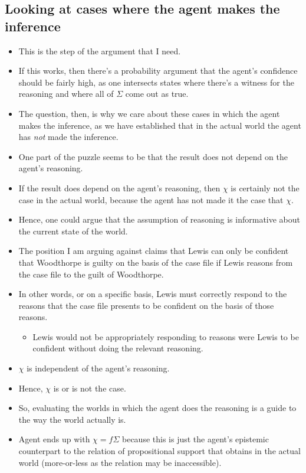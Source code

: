 \documentclass[10pt]{article}
\begin{document}
\subsection{Looking at cases where the agent makes the inference}
\label{sec:looking-at-cases}

\begin{itemize}
\item This is the step of the argument that I need.
\item If this works, then there's a probability argument that the agent's confidence should be fairly high, as one intersects states where there's a witness for the reasoning and where all of \(\Sigma\) come out as true.
\item The question, then, is why we care about these cases in which the agent makes the inference, as we have established that in the actual world the agent has \emph{not} made the inference.
\item One part of the puzzle seems to be that the result does not depend on the agent's reasoning.
\item If the result does depend on the agent's reasoning, then \(\chi\) is certainly not the case in the actual world, because the agent has not made it the case that \(\chi\).
\item Hence, one could argue that the assumption of reasoning is informative about the current state of the world.
\end{itemize}

\begin{itemize}
\item The position I am arguing against claims that Lewis can only be confident that Woodthorpe is guilty on the basis of the case file if Lewis reasons from the case file to the guilt of Woodthorpe.
\item In other words, or on a specific basis, Lewis must correctly respond to the reasons that the case file presents to be confident on the basis of those reasons.
  \begin{itemize}
  \item Lewis would not be appropriately responding to reasons were Lewis to be confident without doing the relevant reasoning.
  \end{itemize}
\end{itemize}

\begin{itemize}
\item \(\chi\) is independent of the agent's reasoning.
\item Hence, \(\chi\) is or is not the case.
\item So, evaluating the worlds in which the agent does the reasoning is a guide to the way the world actually is.
\item Agent ends up with \(\chi = f\Sigma\) because this is just the agent's epistemic counterpart to the relation of propositional support that obtains in the actual world (more-or-less as the relation may be inaccessible).
\end{itemize}
\end{document}
